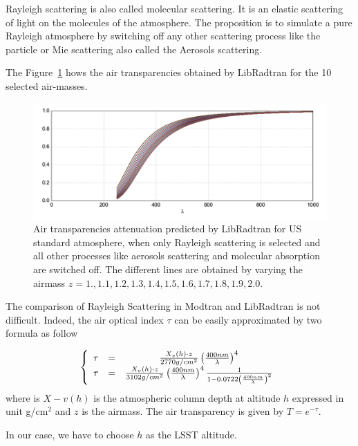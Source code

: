 \documentclass[a4paper]{article}
\begin{document}
Rayleigh scattering is also called molecular scattering. It is an elastic scattering of light on the molecules of the atmosphere. 
The proposition is to simulate a pure Rayleigh atmosphere by switching off any other scattering process like the particle or Mie scattering also called the Aerosols scattering.

The Figure~\ref{fig:rt_rayleigh} hows the air transparencies obtained by LibRadtran for the 10 selected air-masses.
\begin{figure}
\centering
\includegraphics[width=\textwidth]{images/rt_rayleigh}
\caption{\label{fig:rt_rayleigh}Air transparencies attenuation predicted by LibRadtran for US standard atmosphere, when only Rayleigh scattering is selected and all other processes like aerosols scattering and molecular absorption are switched off. The different lines are obtained by varying the airmass $z=1.,1.1,1.2,1.3,1.4,1.5,1.6,1.7,1.8,1.9,2.0$.}
\end{figure}

The comparison of Rayleigh Scattering in Modtran and LibRadtran is not difficult. Indeed, the air optical index $\tau$ can be easily approximated by two formula as follow~\

\begin{equation}
\left\{
\begin{array} {c c c}
\tau& =& \frac{X_v(h)\cdot z}{2770 g/cm^2 } \left( \frac{400 nm}{\lambda}\right)^4 \\
\tau& =& \frac{X_v(h)\cdot z}{3102 g/cm^2 } \left( \frac{400 nm}{\lambda}\right)^4  \frac{1}{ 1-0.0722\left(\frac{400nm}{\lambda}\right)^2} 
\end{array}
\right.
\label{eq:rayleighod}
\end{equation}
where is $X-v(h)$ is the atmospheric column depth at altitude $h$ expressed in unit g/cm$^2$ and $z$ is the airmass.
The air transparency is given by $T=e^{-\tau}$.

In our case, we have to choose $h$ as the LSST altitude.
\end{document}
